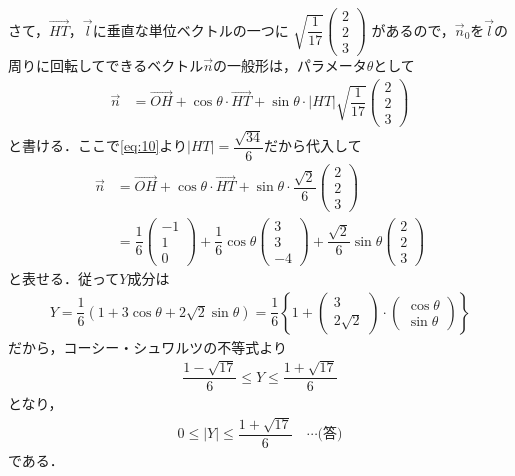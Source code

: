 \documentclass[../../main.tex]{subfiles}
\begin{document}
さて，$\overrightarrow{HT}$，$\vec{l}$に垂直な単位ベクトルの一つに
$\sqrt{\dfrac{1}{17}}
\begin{pmatrix}2\\2\\3
\end{pmatrix}$
があるので，$\vec{n}_{0}$を$\vec{l}$の周りに回転してできるベクトル$\vec{n}$の一般形は，パラメータ$\theta$として
\begin{align}
  \vec{n}
  &= \overrightarrow{OH}+\cos\theta\cdot\overrightarrow{HT}+\sin\theta\cdot|HT|\sqrt{\dfrac{1}{17}}
  \begin{pmatrix}2\\2\\3
  \end{pmatrix}
\end{align}
と書ける．ここで\cref{eq:10}より$|HT|=\dfrac{\sqrt{34}}{6}$だから代入して
\begin{align}
  \vec{n}
  &= \overrightarrow{OH}+\cos\theta\cdot\overrightarrow{HT}+\sin\theta\cdot\dfrac{\sqrt{2}}{6}
  \begin{pmatrix}2\\2\\3
  \end{pmatrix}\\
  &= \dfrac{1}{6}
  \begin{pmatrix}-1\\1\\0
  \end{pmatrix}+\dfrac{1}{6}\cos\theta
  \begin{pmatrix}3\\3\\-4
  \end{pmatrix}+\dfrac{\sqrt{2}}{6}\sin\theta
  \begin{pmatrix}2\\2\\3
  \end{pmatrix}
\end{align}
と表せる．従って$Y$成分は
\begin{align}
  Y = \dfrac{1}{6}(1+3\cos\theta+2\sqrt{2}\sin\theta)
  = \dfrac{1}{6}\left\{1+
    \begin{pmatrix}3\\2\sqrt{2}
    \end{pmatrix}\cdot
    \begin{pmatrix}\cos\theta\\\sin\theta
  \end{pmatrix}\right\}
\end{align}
だから，コーシー・シュワルツの不等式より
\begin{align}
  \dfrac{1-\sqrt{17}}{6}\le Y\le\dfrac{1+\sqrt{17}}{6}
\end{align}
となり，
\begin{align}
  0\le|Y|\le\dfrac{1+\sqrt{17}}{6} \quad\cdots\text{(答)}
\end{align}
である．

\newpage
\end{document}
